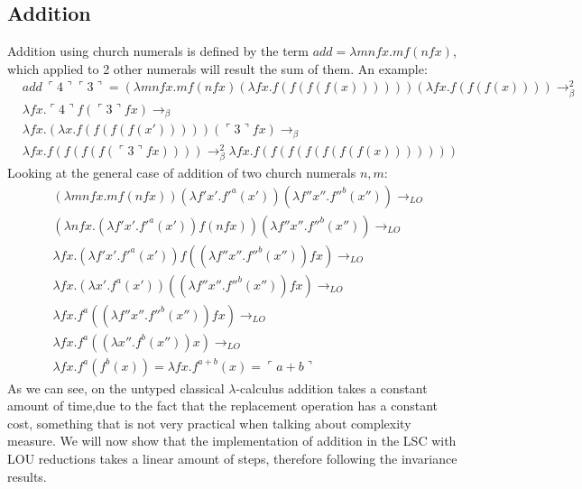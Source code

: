 \documentclass[11pt]{article}
\begin{document}
\subsection{Addition}
Addition using church numerals is defined by the term $\textit{add} = \lambda mnfx.m f(nfx)$, which applied to 2 other numerals will result the sum of them. An example:
\begin{equation*}
	\begin{split}
	& \textit{add} \ \ulcorner 4 \urcorner \ulcorner 3 \urcorner = (\lambda mnfx.m f(nfx)(\lambda fx.f(f(f(f(x))))))(\lambda fx. f(f(f(x)))) \rightarrow_{\beta}^2 \\
 &	\lambda fx. \ulcorner 4 \urcorner f ( \ulcorner 3 \urcorner f x ) \rightarrow_{\beta} \\ 
 	& \lambda fx. (\lambda x . f(f(f(f(x')))))( \ulcorner 3 \urcorner f x ) \rightarrow_{\beta} \\
	& \lambda f x. f ( f ( f ( f (\ulcorner 3 \urcorner f x ) ) ) ) \rightarrow_{\beta}^2 \lambda fx. f ( f ( f ( f ( f ( f ( f ( x ) ) ) ) ) ) ) 
\end{split}
\end{equation*}
Looking at the general case of addition of two church numerals $n,m$:
\begin{equation*}
  \begin{split}
  & (\lambda mnfx. m f (n f x) ) (\lambda f'x'. f'^a(x')) (\lambda f''x''. f''^b(x'')) \rightarrow_{LO} \\
  & (\lambda nfx. (\lambda f'x'. f'^a(x')) f (n f x)) (\lambda f''x''. f''^b(x'')) \rightarrow_{LO} \\
  & \lambda fx. (\lambda f'x'. f'^a(x')) f ((\lambda f''x''. f''^b(x'')) f x) \rightarrow_{LO} \\
  & \lambda fx. (\lambda x'. f^a(x')) ((\lambda f''x''. f''^b(x''))f x) \rightarrow_{LO} \\
  & \lambda fx . f^a((\lambda f''x''. f''^b(x''))f x) \rightarrow_{LO} \\
  & \lambda fx . f^a ((\lambda x''.f^b(x'')) x) \rightarrow_{LO} \\ 
  & \lambda fx. f^a (f^b(x)) = \lambda fx. f^{a + b}(x) = \ulcorner a + b \urcorner 
  \end{split}
\end{equation*}
As we can see, on the untyped classical $\lambda$-calculus addition takes a constant amount of time,due to the fact that the replacement operation has a constant cost, something that is not very practical when talking about complexity measure. We will now show that the implementation of addition in the LSC with LOU reductions takes a linear amount of steps, therefore following the invariance results. 
\end{document}
